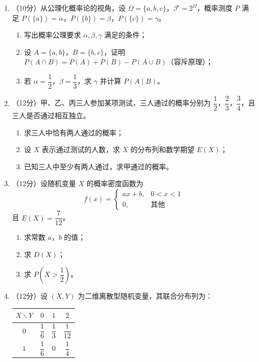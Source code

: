 \documentclass[12pt, a4paper]{ctexart}
\begin{document}
\begin{enumerate}[resume]

\item （10分）从公理化概率论的视角，设 $\Omega=\{a,b,c\}$，$\mathcal{F}=2^{\Omega}$，概率测度 $P$ 满足 $P(\{a\})=\alpha$，$P(\{b\})=\beta$，$P(\{c\})=\gamma$。

\begin{enumerate}[label=(\arabic*)]
    \item 写出概率公理要求 $\alpha,\beta,\gamma$ 满足的条件；
    \item 设 $A=\{a,b\}$，$B=\{b,c\}$，证明 $P(A\cap B)=P(A)+P(B)-P(A\cup B)$（容斥原理）；
    \item 若 $\alpha=\dfrac{1}{2}$，$\beta=\dfrac{1}{3}$，求 $\gamma$ 并计算 $P(A\mid B)$。
\end{enumerate}

\item （12分）甲、乙、丙三人参加某项测试，三人通过的概率分别为 $\dfrac{1}{2}$，$\dfrac{2}{3}$，$\dfrac{3}{4}$，且三人是否通过相互独立。

\begin{enumerate}[label=(\arabic*)]
    \item 求三人中恰有两人通过的概率；
    \item 设 $X$ 表示通过测试的人数，求 $X$ 的分布列和数学期望 $E(X)$；
    \item 已知三人中至少有两人通过，求甲通过的概率。
\end{enumerate}

\item （12分）设随机变量 $X$ 的概率密度函数为
$$f(x)=\begin{cases} ax+b, & 0<x<1 \\ 0, & \text{其他} \end{cases}$$
且 $E(X)=\dfrac{7}{12}$。

\begin{enumerate}[label=(\arabic*)]
    \item 求常数 $a$，$b$ 的值；
    \item 求 $D(X)$；
    \item 求 $P\left(X>\dfrac{1}{2}\right)$。
\end{enumerate}

\item （12分）设 $(X,Y)$ 为二维离散型随机变量，其联合分布列为：

\begin{center}
\begin{tabular}{c|ccc}
$X\backslash Y$ & $0$ & $1$ & $2$ \\ \hline
$0$ & $\dfrac{1}{6}$ & $\dfrac{1}{3}$ & $\dfrac{1}{12}$ \\
$1$ & $\dfrac{1}{6}$ & $0$ & $\dfrac{1}{4}$
\end{tabular}
\end{center}


\end{enumerate}
\end{document}
